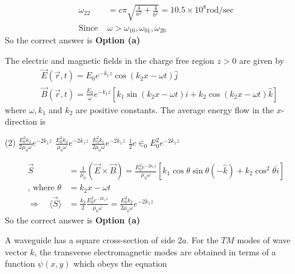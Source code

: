 \begin{enumerate}
\begin{answer}
\begin{align*}
	\omega_{22}&=c \pi \sqrt{\frac{4}{a^{2}}+\frac{4}{b^{2}}}=10.5 \times 10^{8} \mathrm{rod} / \mathrm{sec}\\
	\text{Since }&\omega>\omega_{10}, \omega_{01}, \omega_{20}
	\end{align*}
	So the correct answer is \textbf{Option (a)}
\end{answer}
	\begin{minipage}{\textwidth}
		\item The electric and magnetic fields in the charge free region $z>0$ are given by
		$$
		\begin{aligned}
		&\vec{E}(\vec{r}, t)=E_{0} e^{-k_{1} z} \cos \left(k_{2} x-\omega t\right) \hat{j} \\
		&\vec{B}(\vec{r}, t)=\frac{E_{0}}{\omega} e^{-k_{1} z}\left[k_{1} \sin \left(k_{2} x-\omega t\right) \hat{i}+k_{2} \cos \left(k_{2} x-\omega t\right) \hat{k}\right]
		\end{aligned}
		$$
		where $\omega, k_{1}$ and $k_{2}$ are positive constants. The average energy flow in the $x$-direction is
	\end{minipage}
	\begin{tasks}(2)
		\task[\textbf{a.}] $\frac{E_{0}^{2} k_{2}}{2 \mu_{0} \omega} e^{-2 k_{1} z}$
		\task[\textbf{b.}]$\frac{E_{0}^{2} k_{2}}{\mu_{0} \omega} e^{-2 k_{1} z}$
		\task[\textbf{c.}]$\frac{E_{0}^{2} k_{1}}{2 \mu_{0} \omega} e^{-2 k_{1} z}$
		\task[\textbf{d.}]$\frac{1}{2} c \in_{0} E_{0}^{2} e^{-2 k_{1} z}$
	\end{tasks}
	\begin{answer}
		\begin{align*}
		\vec{S}&=\frac{1}{\mu_{0}}(\vec{E} \times \vec{B})=\frac{E_{0}^{2} e^{-2 k_{1} z}}{\mu_{0} \omega}\left[k_{1} \cos \theta \sin \theta(-\hat{k})+k_{2} \cos ^{2} \theta \hat{i}\right]\\\text{, where }\theta&=k_{2} x-\omega t\\
		\Rightarrow \quad\langle\vec{S}\rangle&=\frac{k_{2}}{2} \frac{E_{0}^{2} e^{-2 k_{1} z}}{\mu_{0} \omega}=\frac{E_{0}^{2} k_{2}}{2 \mu_{0} \omega} e^{-2 k_{1} z}
		\end{align*}
		So the correct answer is \textbf{Option (a)}
	\end{answer}
	\begin{minipage}{\textwidth}
		\item A waveguide has a square cross-section of side $2 a$. For the $T M$ modes of wave vector $k$, the transverse electromagnetic modes are obtained in terms of a function $\psi(x, y)$ which obeys the equation

\end{minipage}
\end{enumerate}
